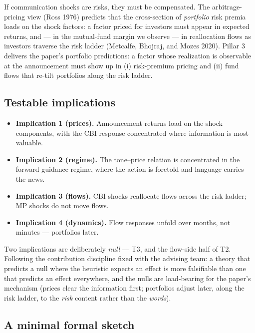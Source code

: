 \documentclass[11pt]{article}
\begin{document}
If communication shocks are risks, they must be compensated. The arbitrage-pricing view (Ross 1976) predicts that the cross-section of \emph{portfolio} risk premia loads on the shock factors: a factor priced for investors must appear in expected returns, and --- in the mutual-fund margin we observe --- in reallocation flows as investors traverse the risk ladder (Metcalfe, Bhojraj, and Mozes 2020). Pillar 3 delivers the paper's portfolio predictions: a factor whose realization is observable at the announcement must show up in (i) risk-premium pricing and (ii) fund flows that re-tilt portfolios along the risk ladder.

\subsection{Testable implications}\label{testable-implications}

\begin{itemize}\setlength{\itemsep}{2pt}
\item \textbf{Implication 1 (prices).} Announcement returns load on the shock components, with the CBI response concentrated where information is most valuable.
\item \textbf{Implication 2 (regime).} The tone--price relation is concentrated in the forward-guidance regime, where the action is foretold and language carries the news.
\item \textbf{Implication 3 (flows).} CBI shocks reallocate flows across the risk ladder; MP shocks do not move flows.
\item \textbf{Implication 4 (dynamics).} Flow responses unfold over months, not minutes --- portfolios later.
\end{itemize}


Two implications are deliberately \emph{null} --- T3, and the flow-side half of T2. Following the contribution discipline fixed with the advising team: a theory that predicts a null where the heuristic expects an effect is more falsifiable than one that predicts an effect everywhere, and the nulls are load-bearing for the paper's mechanism (prices clear the information first; portfolios adjust later, along the risk ladder, to the \emph{risk} content rather than the \emph{words}).

\subsection{A minimal formal sketch}\label{a-minimal-formal-sketch}
\end{document}
